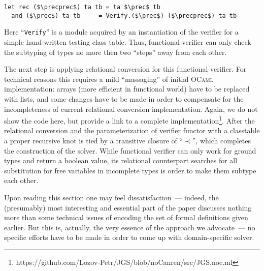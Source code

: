 \begin{lstlisting}[language=ocanren,mathescape=true]
  let rec ($\precprec$) ta tb = ta $\prec$ tb 
  and ($\prec$) ta tb     = Verify.($\prec$) ($\precprec$) ta tb
\end{lstlisting}

Here ``\lstinline|Verify|'' is a module acquired by an instantiation of the verifier for a simple hand-written testing class table.
Thus, functional verifier can only check the subtyping of types no more then two ``steps'' away from each other.

The next step is applying relational conversion for this functional verifier. For technical reasons this requires a mild
``massaging'' of initial \textsc{OCaml} implementation: arrays (more efficient in functional world) have to be replaced
with lists, and some changes have to be made in order to compensate for the incompleteness of current relational
conversion implementation. Again, we do not show the code here, but provide a link to a complete implementation\footnote{https://github.com/Lozov-Petr/JGS/blob/noCanren/src/JGS.noc.ml}.
After the relational conversion and the parameterization of verifier functor with a classtable a proper recursive knot is tied by a transitive closure of ``$\prec$'', which
completes the construction of the solver. While functional verifier can only work for ground types and return a boolean value, its relational counterpart
searches for all substitution for free variables in incomplete types is order to make them subtype each other.

Upon reading this section one may feel dissatisfaction~--- indeed, the (presumably) most interesting and essential part of the paper discusses nothing more
than some technical issues of encoding the set of formal definitions given earlier. But this is, actually, the very essence of the approach we advocate~---
no specific efforts have to be made in order to come up with domain-specific solver. 


